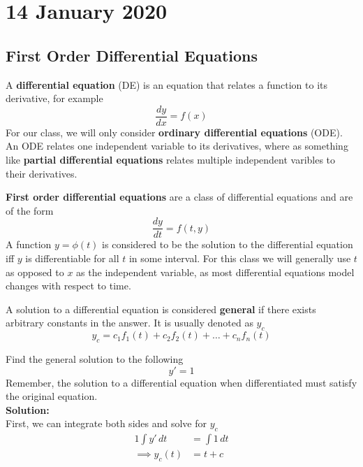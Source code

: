 \documentclass[diffeq.tex]{subfiles}
\begin{document}
\chapter{14 January 2020}
    \section{First Order Differential Equations}
    \begin{definition}
        A \textbf{differential equation} (DE) is an equation that relates a function to its derivative, for example
        \begin{equation}
            \frac{dy}{dx} = f(x)
        \end{equation}
        For our class, we will only consider \textbf{ordinary differential equations} (ODE). An ODE relates one independent variable to its derivatives, where as something like \textbf{partial differential equations} relates multiple independent varibles to their derivatives.
    \end{definition}
    \begin{definition}
        \textbf{First order differential equations} are a class of differential equations and are of the form
        \begin{equation}
            \frac{dy}{dt} = f(t, y)
        \end{equation}
        A function $y = \phi(t)$ is considered to be the solution to the differential equation iff $y$ is differentiable for all $t$ in some interval.
        For this class we will generally use $t$ as opposed to $x$ as the independent variable, as most differential equations model changes with respect to time.
    \end{definition}
    \begin{definition}
        A solution to a differential equation is considered \textbf{general} if there exists arbitrary constants in the answer. It is usually denoted as $y_{c}$
        \begin{equation}
            y_{c} = c_1f_{1}(t) + c_2f_{2}(t) + \dots + c_nf_{n}(t)
        \end{equation}
    \end{definition}
    \np
    \begin{example}
        \label{ex1-1}
        Find the general solution to the following
        \begin{equation}
            y' = 1
        \end{equation}
        Remember, the solution to a differential equation when differentiated must satisfy the original equation.\\[1em]
        \noindent
        \textbf{Solution:}\\
        First, we can integrate both sides and solve for $y_c$
        \begin{alignat}{1}
            \int y'\,dt &= \int 1\,dt\\
            \implies y_{c}(t) &= t + c
        \end{alignat}
    \end{example}
\end{document}

